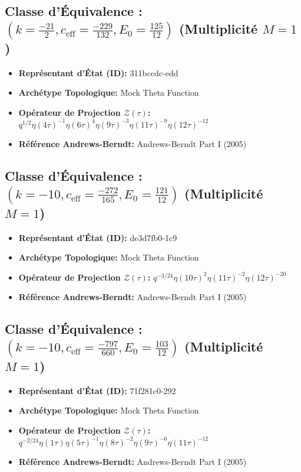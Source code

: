 \documentclass[11pt,twoside,openright]{book}
\begin{document}
\subsection*{Classe d'Équivalence : $(k=\frac{-21}{2}, c_{\text{eff}}=\frac{-229}{132}, E_0=\frac{125}{12})$ (Multiplicité $M=1$)}
\begin{itemize}
  \item \textbf{Représentant d'État (ID):} 311bccdc-edd
  \item \textbf{Archétype Topologique:} Mock Theta Function
  \item \textbf{Opérateur de Projection $\mathcal{Z}(\tau)$:} $q^{1/2} \eta(4\tau)^{-1} \eta(6\tau)^{4} \eta(9\tau)^{-3} \eta(11\tau)^{-9} \eta(12\tau)^{-12}$
  \item \textbf{Référence Andrews-Berndt:} Andrews-Berndt Part I (2005)
\end{itemize}

\subsection*{Classe d'Équivalence : $(k=-10, c_{\text{eff}}=\frac{-272}{165}, E_0=\frac{121}{12})$ (Multiplicité $M=1$)}
\begin{itemize}
  \item \textbf{Représentant d'État (ID):} de3d7fb0-1c9
  \item \textbf{Archétype Topologique:} Mock Theta Function
  \item \textbf{Opérateur de Projection $\mathcal{Z}(\tau)$:} $q^{-3/24} \eta(10\tau)^{2} \eta(11\tau)^{-2} \eta(12\tau)^{-20}$
  \item \textbf{Référence Andrews-Berndt:} Andrews-Berndt Part I (2005)
\end{itemize}

\subsection*{Classe d'Équivalence : $(k=-10, c_{\text{eff}}=\frac{-797}{660}, E_0=\frac{103}{12})$ (Multiplicité $M=1$)}
\begin{itemize}
  \item \textbf{Représentant d'État (ID):} 71f281c0-292
  \item \textbf{Archétype Topologique:} Mock Theta Function
  \item \textbf{Opérateur de Projection $\mathcal{Z}(\tau)$:} $q^{-2/24} \eta(1\tau) \eta(5\tau)^{-1} \eta(8\tau)^{-2} \eta(9\tau)^{-6} \eta(11\tau)^{-12}$
  \item \textbf{Référence Andrews-Berndt:} Andrews-Berndt Part I (2005)
\end{itemize}
\end{document}
